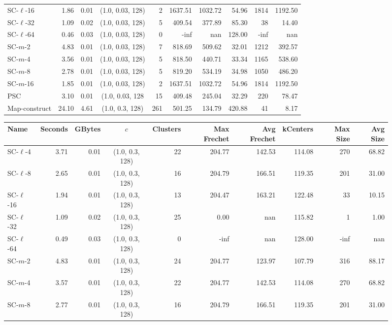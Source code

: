 \begin{figure}[h]
\begin{center}
\begin{minipage}{\textwidth}
{\begin{tabular}{@{}lrrcrrrrrr@{}}
        SC-$\ell$-16 & 1.86 & 0.01 & (1.0, 0.03, 128) & 2 & 1637.51 & 1032.72 & 54.96 & 1814 & 1192.50\\
        SC-$\ell$-32 & 1.09 & 0.02 & (1.0, 0.03, 128) & 5 & 409.54 & 377.89 & 85.30 & 38 & 14.40\\
        SC-$\ell$-64 & 0.46 & 0.03 & (1.0, 0.03, 128) & 0 & -inf & nan & 128.00 & -inf & nan\\
        SC-$m$-2 & 4.83 & 0.01 & (1.0, 0.03, 128) & 7 & 818.69 & 509.62 & 32.01 & 1212 & 392.57\\
        SC-$m$-4 & 3.56 & 0.01 & (1.0, 0.03, 128) & 5 & 818.50 & 440.71 & 33.34 & 1165 & 538.60\\
        SC-$m$-8 & 2.78 & 0.01 & (1.0, 0.03, 128) & 5 & 819.20 & 534.19 & 34.98 & 1050 & 486.20\\
        SC-$m$-16 & 1.85 & 0.01 & (1.0, 0.03, 128) & 2 & 1637.51 & 1032.72 & 54.96 & 1814 & 1192.50\\
        PSC & 3.10 & 0.01 & (1.0, 0.03, 128 & 15 & 409.48 & 245.04 & 32.29 & 220 & 78.47\\
        Map-construct & 24.10 & 4.61 & (1.0, 0.3, 128) & 261 & 501.25 & 134.79 & 420.88 & 41 & 8.17\\
        \bottomrule
    \end{tabular}}
%
    {
    \begin{tabular}{@{}lrrcrrrrrr@{}}
        \toprule
        Name & Seconds & GBytes & $c$ & Clusters & Max Frechet & Avg Frechet & kCenters & Max Size & Avg Size\\
        \midrule
        SC-$\ell$-4 & 3.71 & 0.01 & (1.0, 0.3, 128) & 22 & 204.77 & 142.53 & 114.08 & 270 & 68.82\\
        SC-$\ell$-8 & 2.65 & 0.01 & (1.0, 0.3, 128) & 16 & 204.79 & 166.51 & 119.35 & 201 & 31.00\\
        SC-$\ell$-16 & 1.94 & 0.01 & (1.0, 0.3, 128) & 13 & 204.47 & 163.21 & 122.48 & 33 & 10.15\\
        SC-$\ell$-32 & 1.09 & 0.02 & (1.0, 0.3, 128) & 25 & 0.00 & nan & 115.82 & 1 & 1.00\\
        SC-$\ell$-64 & 0.49 & 0.03 & (1.0, 0.3, 128) & 0 & -inf & nan & 128.00 & -inf & nan\\
        SC-$m$-2 & 4.83 & 0.01 & (1.0, 0.3, 128) & 24 & 204.77 & 123.97 & 107.79 & 316 & 88.17\\
        SC-$m$-4 & 3.57 & 0.01 & (1.0, 0.3, 128) & 22 & 204.77 & 142.53 & 114.08 & 270 & 68.82\\
        SC-$m$-8 & 2.77 & 0.01 & (1.0, 0.3, 128) & 16 & 204.79 & 166.51 & 119.35 & 201 & 31.00\\

\end{tabular}}
\end{minipage}
\end{center}
\end{figure}
